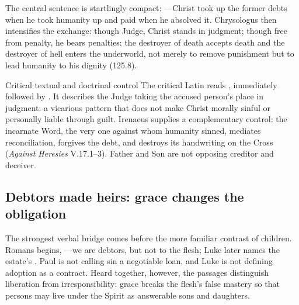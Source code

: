 \begin{deepstudy}
The central sentence is startlingly compact: ---Christ took up the former debts when he took humanity up and paid when he absolved it. Chrysologus then intensifies the exchange: though Judge, Christ stands in judgment; though free from penalty, he bears penalties; the destroyer of death accepts death and the destroyer of hell enters the underworld, not merely to remove punishment but to lead humanity to his dignity (125.8).

\begin{sourcecard}{Critical textual and doctrinal control}
The critical Latin reads , immediately followed by . It describes the Judge taking the accused person's place in judgment: a vicarious pattern that does not make Christ morally sinful or personally liable through guilt. Irenaeus supplies a complementary control: the incarnate Word, the very one against whom humanity sinned, mediates reconciliation, forgives the debt, and destroys its handwriting on the Cross (\emph{Against Heresies} V.17.1--3). Father and Son are not opposing creditor and deceiver.
\end{sourcecard}

\sectionguard
\subsection*{Debtors made heirs: grace changes the obligation\enspace{}}

The strongest verbal bridge comes before the more familiar contrast of children. Romans begins, ---we are debtors, but not to the flesh; Luke later names the estate's . Paul is not calling sin a negotiable loan, and Luke is not defining adoption as a contract. Heard together, however, the passages distinguish liberation from irresponsibility: grace breaks the flesh's false mastery so that persons may live under the Spirit as answerable sons and daughters.


\end{deepstudy}
